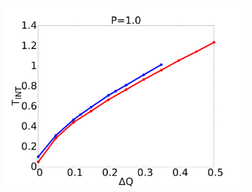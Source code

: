 \documentclass[handout]{beamer}
\begin{document}
\begin{frame}
\begin{figure}
\begin{center}
\begin{subfigure}[t]{0.3\textwidth}
            \includegraphics[scale=0.11]{../images/p1_int.pdf}
        \end{subfigure} 
    \end{center}
\end{figure}
\end{frame}
\end{document}
